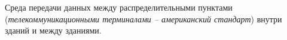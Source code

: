 Среда передачи данных между распределительными пунктами
({\it телекоммуникационными терминалами -- американский стандарт})
внутри зданий и между зданиями.